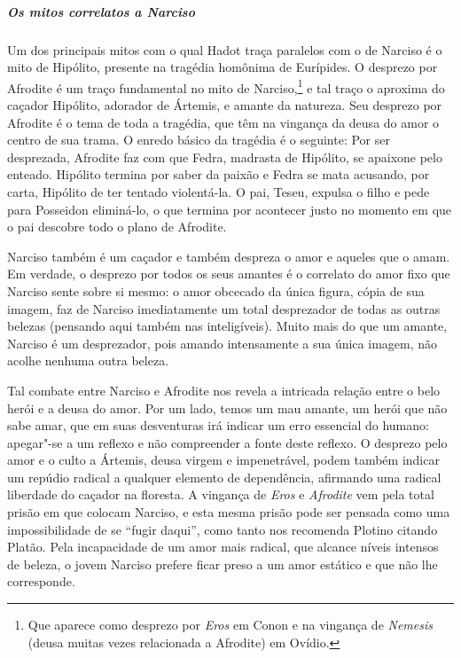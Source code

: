 \subparagraph{Os mitos correlatos a Narciso}
Um dos principais mitos com o qual Hadot traça paralelos com o de
Narciso é o mito de Hipólito, presente na tragédia homônima de
Eurípides. O desprezo por Afrodite é um traço fundamental no mito de
Narciso,\footnote{ Que aparece como desprezo por \emph{Eros} em
Conon e na vingança de \emph{Nemesis} (deusa muitas vezes
relacionada a Afrodite) em Ovídio.} e tal traço o aproxima do
caçador Hipólito, adorador de Ártemis, e amante da natureza. Seu
desprezo por Afrodite é o tema de toda a tragédia, que têm na
vingança da deusa do amor o centro de sua trama. O enredo básico da
tragédia é o seguinte: Por ser desprezada, Afrodite faz com que
Fedra, madrasta de Hipólito, se apaixone pelo enteado. Hipólito
termina por saber da paixão e Fedra se mata acusando, por carta,
Hipólito de ter tentado violentá-la. O pai, Teseu, expulsa o filho e
pede para Posseidon eliminá-lo, o que termina por acontecer justo no
momento em que o pai descobre todo o plano de Afrodite. 

Narciso também é um caçador e também despreza o amor e aqueles que o
amam. Em verdade, o desprezo por todos os seus amantes é o correlato
do amor fixo que Narciso sente sobre si mesmo: o amor obcecado da
única figura, cópia de sua imagem, faz de Narciso imediatamente um
total desprezador de todas as outras belezas (pensando aqui também
nas inteligíveis). Muito mais do que um amante, Narciso é um
desprezador, pois amando intensamente a sua única imagem, não acolhe
nenhuma outra beleza. 

Tal combate entre Narciso e Afrodite nos revela a intricada relação
entre o belo herói e a deusa do amor. Por um lado, temos um mau
amante, um herói que não sabe amar, que em suas desventuras irá
indicar um erro essencial do humano: apegar"-se a um reflexo e não
compreender a fonte deste reflexo. O desprezo pelo amor e o culto a
Ártemis, deusa virgem e impenetrável, podem também indicar um repúdio
radical a qualquer elemento de dependência, afirmando uma radical
liberdade do caçador na floresta. A vingança de \emph{Eros} e
\emph{Afrodite} vem pela total prisão em que colocam Narciso, e
esta mesma prisão pode ser pensada como uma impossibilidade de se
“fugir daqui”, como tanto nos recomenda Plotino citando Platão. Pela
incapacidade de um amor mais radical, que alcance níveis intensos de
beleza, o jovem Narciso prefere ficar preso a um amor estático e que
não lhe corresponde.

